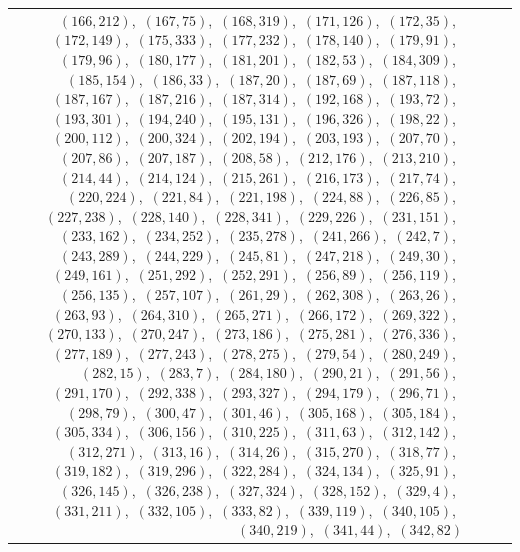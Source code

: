 \documentclass[11pt]{article}
\begin{document}
\begin{longtable}{@{}rrl>{\raggedright\arraybackslash}p{}@{}}
$(166,212)$,\allowbreak\ $(167,75)$,\allowbreak\ $(168,319)$,\allowbreak\ $(171,126)$,\allowbreak\ $(172,35)$,\allowbreak\ $(172,149)$,\allowbreak\ $(175,333)$,\allowbreak\ $(177,232)$,\allowbreak\ $(178,140)$,\allowbreak\ $(179,91)$,\allowbreak\ $(179,96)$,\allowbreak\ $(180,177)$,\allowbreak\ $(181,201)$,\allowbreak\ $(182,53)$,\allowbreak\ $(184,309)$,\allowbreak\ $(185,154)$,\allowbreak\ $(186,33)$,\allowbreak\ $(187,20)$,\allowbreak\ $(187,69)$,\allowbreak\ $(187,118)$,\allowbreak\ $(187,167)$,\allowbreak\ $(187,216)$,\allowbreak\ $(187,314)$,\allowbreak\ $(192,168)$,\allowbreak\ $(193,72)$,\allowbreak\ $(193,301)$,\allowbreak\ $(194,240)$,\allowbreak\ $(195,131)$,\allowbreak\ $(196,326)$,\allowbreak\ $(198,22)$,\allowbreak\ $(200,112)$,\allowbreak\ $(200,324)$,\allowbreak\ $(202,194)$,\allowbreak\ $(203,193)$,\allowbreak\ $(207,70)$,\allowbreak\ $(207,86)$,\allowbreak\ $(207,187)$,\allowbreak\ $(208,58)$,\allowbreak\ $(212,176)$,\allowbreak\ $(213,210)$,\allowbreak\ $(214,44)$,\allowbreak\ $(214,124)$,\allowbreak\ $(215,261)$,\allowbreak\ $(216,173)$,\allowbreak\ $(217,74)$,\allowbreak\ $(220,224)$,\allowbreak\ $(221,84)$,\allowbreak\ $(221,198)$,\allowbreak\ $(224,88)$,\allowbreak\ $(226,85)$,\allowbreak\ $(227,238)$,\allowbreak\ $(228,140)$,\allowbreak\ $(228,341)$,\allowbreak\ $(229,226)$,\allowbreak\ $(231,151)$,\allowbreak\ $(233,162)$,\allowbreak\ $(234,252)$,\allowbreak\ $(235,278)$,\allowbreak\ $(241,266)$,\allowbreak\ $(242,7)$,\allowbreak\ $(243,289)$,\allowbreak\ $(244,229)$,\allowbreak\ $(245,81)$,\allowbreak\ $(247,218)$,\allowbreak\ $(249,30)$,\allowbreak\ $(249,161)$,\allowbreak\ $(251,292)$,\allowbreak\ $(252,291)$,\allowbreak\ $(256,89)$,\allowbreak\ $(256,119)$,\allowbreak\ $(256,135)$,\allowbreak\ $(257,107)$,\allowbreak\ $(261,29)$,\allowbreak\ $(262,308)$,\allowbreak\ $(263,26)$,\allowbreak\ $(263,93)$,\allowbreak\ $(264,310)$,\allowbreak\ $(265,271)$,\allowbreak\ $(266,172)$,\allowbreak\ $(269,322)$,\allowbreak\ $(270,133)$,\allowbreak\ $(270,247)$,\allowbreak\ $(273,186)$,\allowbreak\ $(275,281)$,\allowbreak\ $(276,336)$,\allowbreak\ $(277,189)$,\allowbreak\ $(277,243)$,\allowbreak\ $(278,275)$,\allowbreak\ $(279,54)$,\allowbreak\ $(280,249)$,\allowbreak\ $(282,15)$,\allowbreak\ $(283,7)$,\allowbreak\ $(284,180)$,\allowbreak\ $(290,21)$,\allowbreak\ $(291,56)$,\allowbreak\ $(291,170)$,\allowbreak\ $(292,338)$,\allowbreak\ $(293,327)$,\allowbreak\ $(294,179)$,\allowbreak\ $(296,71)$,\allowbreak\ $(298,79)$,\allowbreak\ $(300,47)$,\allowbreak\ $(301,46)$,\allowbreak\ $(305,168)$,\allowbreak\ $(305,184)$,\allowbreak\ $(305,334)$,\allowbreak\ $(306,156)$,\allowbreak\ $(310,225)$,\allowbreak\ $(311,63)$,\allowbreak\ $(312,142)$,\allowbreak\ $(312,271)$,\allowbreak\ $(313,16)$,\allowbreak\ $(314,26)$,\allowbreak\ $(315,270)$,\allowbreak\ $(318,77)$,\allowbreak\ $(319,182)$,\allowbreak\ $(319,296)$,\allowbreak\ $(322,284)$,\allowbreak\ $(324,134)$,\allowbreak\ $(325,91)$,\allowbreak\ $(326,145)$,\allowbreak\ $(326,238)$,\allowbreak\ $(327,324)$,\allowbreak\ $(328,152)$,\allowbreak\ $(329,4)$,\allowbreak\ $(331,211)$,\allowbreak\ $(332,105)$,\allowbreak\ $(333,82)$,\allowbreak\ $(339,119)$,\allowbreak\ $(340,105)$,\allowbreak\ $(340,219)$,\allowbreak\ $(341,44)$,\allowbreak\ $(342,82)$\\

\end{longtable}
\end{document}
